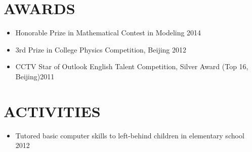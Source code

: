 \documentclass[margin,10pt]{res} %
\begin{document}
\begin{resume}

\section{AWARDS}
\begin{itemize}\itemsep -12pt
    \item Honorable Prize in Mathematical Contest in Modeling {\hfill 2014}\\

    \item 3rd Prize in College Physics Competition, Beijing {\hfill 2012}\\
    \item CCTV Star of Outlook English Talent Competition, Silver Award (Top 16, Beijing){\hfill 2011}
\end{itemize}

\section{ACTIVITIES}
\begin{itemize}\itemsep -12pt
\item Tutored basic computer skills to left-behind children in elementary school {\hfill  2012}\\
\end{itemize}

\end{resume}
\end{document}
